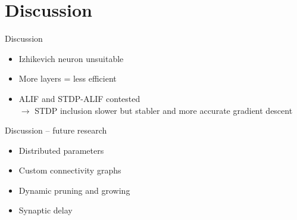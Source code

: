 \documentclass[t]{beamer}
\begin{document}
\section{Discussion}
\begin{frame}{Discussion}
  \begin{itemize}[label=--]
    \item Izhikevich neuron unsuitable
    \item More layers = less efficient
    \item ALIF and STDP-ALIF contested\\$\rightarrow$ STDP inclusion slower but stabler and more accurate gradient descent
  \end{itemize}
\end{frame}

\begin{frame}{Discussion -- future research}
  \begin{itemize}[label=--]
    \item Distributed parameters
    \item Custom connectivity graphs
    \item Dynamic pruning and growing
    \item Synaptic delay
  \end{itemize}
\end{frame}
\end{document}
